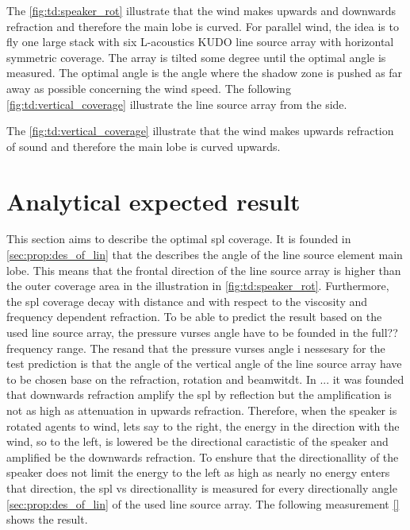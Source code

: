 The \autoref{fig:td:speaker_rot} illustrate that the wind makes upwards and downwards refraction and therefore the main lobe is curved. For parallel wind, the idea is to fly one large stack with six L-acoustics KUDO line source array with horizontal symmetric coverage. The array is tilted some degree until the optimal angle is measured. The optimal angle is the angle where the shadow zone is pushed as far away as possible concerning the wind speed. The following \autoref{fig:td:vertical_coverage} illustrate the line source array from the side.

   

The \autoref{fig:td:vertical_coverage} illustrate that the wind makes upwards refraction of sound and therefore the main lobe is curved upwards.




\section{Analytical expected result}

This section aims to describe the optimal \gls{spl} coverage. It is founded in \autoref{sec:prop:des_of_lin} that the  describes the angle of the line source element main lobe. This means that the frontal direction of the line source array is  higher than the outer coverage area in the illustration in \autoref{fig:td:speaker_rot}. Furthermore, the \gls{spl} coverage decay with distance and with respect to the viscosity and frequency dependent refraction. To be able to predict the result based on the used line source array, the pressure vurses angle have to be founded in the full?? frequency range. The resand that the pressure vurses angle i nessesary for the test prediction is that the angle of the vertical angle of the line source array have to be chosen base on the refraction, rotation and beamwitdt. In ... it was founded that downwards refraction amplify the \gls{spl} by reflection but the amplification is not as high as attenuation in upwards refraction. Therefore, when the speaker is rotated agents to wind,  lets say to the right, the energy in the direction with the wind, so to the left, is lowered be the directional caractistic of the speaker and amplified be the downwards refraction. To enshure that the directionallity of the speaker does not limit the energy to the left as high as nearly no energy enters that direction, the \gls{spl} vs directionallity is measured for every directionally angle \autoref{sec:prop:des_of_lin} of the used line source array. The following measurement \autoref{} shows the result.



